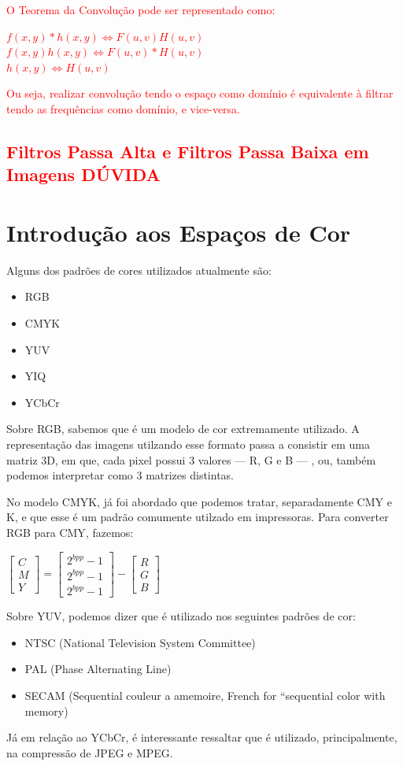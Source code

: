 \documentclass[a4paper, 12pt]{article}
\begin{document}
\textcolor{red}{
O Teorema da Convolução pode ser representado como:
\begin{center}
 $f(x,y) * h(x,y) \Leftrightarrow F(u,v)H(u,v)$
 \\
 $f(x,y)h(x,y) \Leftrightarrow F(u,v)*H(u,v)$
 \\
 $h(x,y) \Leftrightarrow H(u,v)$
\end{center}
Ou seja, realizar convolução tendo o espaço como domínio é equivalente à filtrar tendo as frequências como domínio, e vice-versa.
}
\textcolor{red}{
\section{Filtros Passa Alta e Filtros Passa Baixa em Imagens \textcolor{red}{DÚVIDA}} }


\section{Introdução aos Espaços de Cor}
Alguns dos padrões de cores utilizados atualmente são:
\begin{itemize}
	\item RGB
 \item CMYK
 \item YUV
 \item YIQ
 \item YCbCr
\end{itemize}

Sobre RGB, sabemos que é um modelo de cor extremamente utilizado. A representação das imagens utilzando esse formato passa a consistir em uma matriz 
3D, em que, cada pixel possui $3$ valores --- R, G e B --- , ou, também podemos interpretar como $3$ matrizes distintas.

No modelo CMYK, já foi abordado que podemos tratar, separadamente CMY e K, e que esse é um padrão comumente utilzado em impressoras. Para converter RGB 
para CMY, fazemos: 
\begin{center}
	$
	\begin{bmatrix}
		C \\
		M \\
		Y
	\end{bmatrix}
	= 
	\begin{bmatrix}
		2^{bpp} - 1 \\
		2^{bpp} - 1 \\
		2^{bpp} - 1
	\end{bmatrix}
	- 
	\begin{bmatrix}
		R \\
		G \\
		B
	\end{bmatrix}
	$
\end{center}
Sobre YUV, podemos dizer que é utilizado nos seguintes padrões de cor:
\begin{itemize}
	\item NTSC (National Television System Committee)
 	\item PAL (Phase Alternating Line)
 	\item SECAM (Sequential couleur a amemoire, French for “sequential color with memory)
\end{itemize}
Já em relação ao YCbCr, é interessante ressaltar que é utilizado, principalmente, na compressão de JPEG e MPEG.
\end{document}
